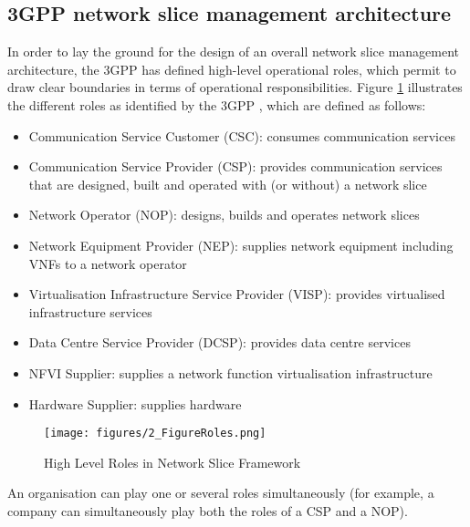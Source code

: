 \subsection{3GPP network slice management architecture}
\label{subsec:mgmt_architecture}
\noindent
In order to lay the ground for the design of an overall network slice management architecture, the 3GPP has defined high-level operational roles, which permit to draw clear boundaries in terms of operational responsibilities. Figure \ref{2_figRoles} illustrates the different roles as identified by the 3GPP \cite{3GPPTS28530}, which are defined as follows:
%
\renewcommand\labelitemi{$\bullet$}
\begin{itemize}[noitemsep,topsep=2pt]
    \item Communication Service Customer (CSC): consumes communication services 
    \item Communication Service Provider (CSP): provides communication services that are designed, built and operated with (or without) a network slice 
    \item Network Operator (NOP): designs, builds and operates network slices 
    \item Network Equipment Provider (NEP): supplies network equipment including VNFs to a network operator 
    \item Virtualisation Infrastructure Service Provider (VISP): provides virtualised infrastructure services  
    \item Data Centre Service Provider (DCSP): provides data centre services 
    \item NFVI Supplier: supplies a network function virtualisation infrastructure 
    \item Hardware Supplier: supplies hardware 
\end{itemize}
%
\begin{figure}[ht]
\centering
\texttt{[image: figures/2\_FigureRoles.png]}
\caption{High Level Roles in Network Slice Framework}
\label{2_figRoles}
\end{figure}
%
An organisation can play one or several roles simultaneously (for example, a company can simultaneously play both the roles of a CSP and a NOP).

